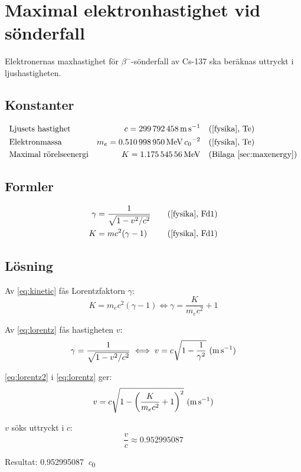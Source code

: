\section{Maximal elektronhastighet vid sönderfall} \label{sec:speed}

Elektronernas maxhastighet för $\beta^-$-sönderfall av Cs-137 ska beräknas
uttryckt i ljushastigheten.

\subsection*{Konstanter}

\begin{align*}
    & \text{Ljusets hastighet}     & c   = \qty{299792458}{\m\per\s}                  &\quad \fysika{Te}                      \\
    & \text{Elektronmassa}         & m_e = \qty{0.510998950}{\MeV\per\clight\squared} &\quad \fysika{Te}                      \\
    & \text{Maximal rörelseenergi} & K   = \qty{1.17554556}{\MeV}                     &\quad \text{(Bilaga~\ref{sec:maxenergy})}
\end{align*}

\subsection*{Formler}

\begin{align}
    \gamma &= \frac{1}{\sqrt{1 - v^2/c^2}} &\quad \fysika{Fd1} \label{eq:lorentz} \\
         K &= mc^2(\gamma - 1)             &\quad \fysika{Fd1} \label{eq:kinetic}
\end{align}

\subsection*{Lösning}

Av \eqref{eq:kinetic} fås Lorentzfaktorn $\gamma$:
%
\begin{equation}
    K = m_e c^2(\gamma - 1) \iff \gamma = \frac{K}{m_e c^2} + 1 \label{eq:lorentz2}
\end{equation}

Av \eqref{eq:lorentz} fås hastigheten $v$:
%
\begin{equation}
    \gamma = \frac{1}{\sqrt{1 - v^2/c^2}} \iff v = c \sqrt{1 - \frac{1}{\gamma^2}} \inlineunit{\m\per\s} \label{eq:speed}
\end{equation}

\eqref{eq:lorentz2} i \eqref{eq:lorentz} ger:
%
\begin{equation}
    v = c \sqrt{1 - \left( \frac{K}{m_e c^2} + 1 \right)^2} \inlineunit{\m\per\s}
\end{equation}

$v$ söks uttryckt i $c$:
%
\begin{equation}
    \frac{v}{c} \approx \num{0.952995087}
\end{equation}

Resultat: \qty{0.952995087}{\clight}
